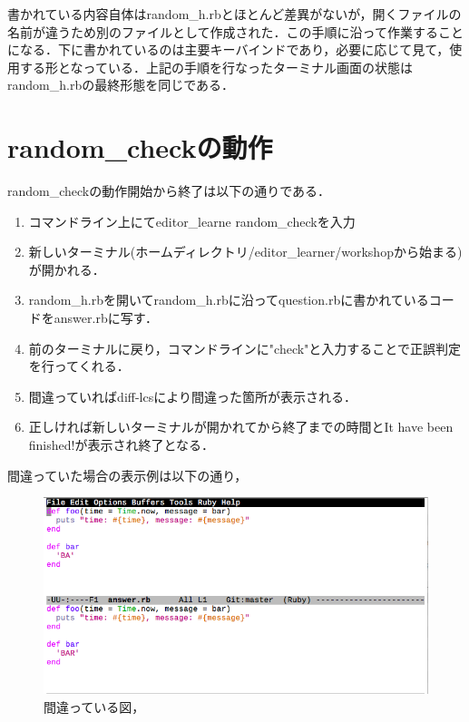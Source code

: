 書かれている内容自体はrandom\_h.rbとほとんど差異がないが，開くファイルの名前が違うため別のファイルとして作成された．この手順に沿って作業することになる．下に書かれているのは主要キーバインドであり，必要に応じて見て，使用する形となっている．上記の手順を行なったターミナル画面の状態はrandom\_h.rbの最終形態を同じである．

    \section{random\_checkの動作}\label{random_checkux306eux52d5ux4f5c}

random\_checkの動作開始から終了は以下の通りである．

\begin{enumerate}
\def\labelenumi{\arabic{enumi}.}
\tightlist
\item
  コマンドライン上にてeditor\_learne random\_checkを入力
\item
  新しいターミナル(ホームディレクトリ/editor\_learner/workshopから始まる)が開かれる．
\item
  random\_h.rbを開いてrandom\_h.rbに沿ってquestion.rbに書かれているコードをanswer.rbに写す．
\item
  前のターミナルに戻り，コマンドラインに"check"と入力することで正誤判定を行ってくれる．
\item
  間違っていればdiff-lcsにより間違った箇所が表示される．
\item
  正しければ新しいターミナルが開かれてから終了までの時間とIt have been
  finished!が表示され終了となる．
\end{enumerate}
間違っていた場合の表示例は以下の通り，
\begin{figure}[H]
\centering
\begin{center}
\includegraphics[width=150mm]{../../picture/diffp.png}
\end{center}
\caption{間違っている図，\label{sample}}
\end{figure}

